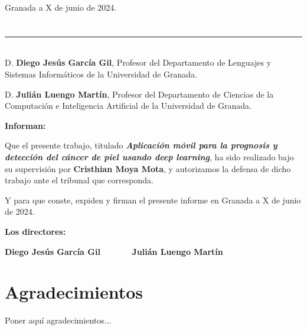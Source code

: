 \begin{flushright}
Granada a X de junio de 2024.
\end{flushright}


\chapter*{}
\thispagestyle{empty}

\noindent\rule[-1ex]{\textwidth}{2pt}\\[4.5ex]

D. \textbf{Diego Jesús García Gil}, Profesor del Departamento de Lenguajes y Sistemas Informáticos de la Universidad de Granada.

\vspace{0.5cm}

D. \textbf{Julián Luengo Martín}, Profesor del Departamento de Ciencias de la Computación e Inteligencia Artificial
 de la Universidad de Granada.


\vspace{0.5cm}

\textbf{Informan:}

\vspace{0.5cm}

Que el presente trabajo, titulado \textit{\textbf{Aplicación móvil para la prognosis y detección del cáncer de piel usando deep learning}},
ha sido realizado bajo su supervisión por \textbf{Cristhian Moya Mota}, y autorizamos la defensa de dicho trabajo ante el tribunal
que corresponda.

\vspace{0.5cm}

Y para que conste, expiden y firman el presente informe en Granada a X de junio de 2024.

\vspace{1cm}

\textbf{Los directores:}

\vspace{5cm}

\noindent \textbf{Diego Jesús García Gil \ \ \ \ \ \ Julián Luengo Martín}

\chapter*{Agradecimientos}
\thispagestyle{empty}

       \vspace{1cm}


Poner aquí agradecimientos...

